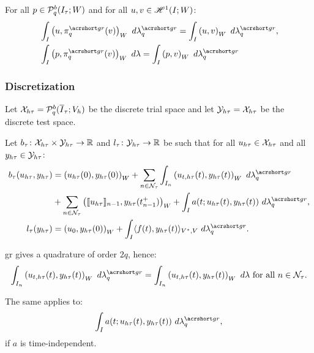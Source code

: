 \begin{proposition}
    For all $p \in \mathcal{P}_{q}^b(I_{\tau}; W)$ and for all $u, v \in \mathscr{H}^{1}(I; W)$:
    \begin{align}
        & \int_I \left( u, \InterpolantGR_q(v) \right)_W ~ d \lambdaGR_q = \int_I \left( u, v \right)_W ~ d \lambdaGR_q, \\
        & \int_I \left( p, \InterpolantGR_q(v) \right)_W ~ d \lambda = \int_I \left( p, v \right)_W ~ d \lambdaGR_q
    \end{align}
\end{proposition}

\subsubsection{Discretization}

\begin{definition}
    Let $\mathcal{X}_{h \tau} = \mathcal{P}_{q}^b(\overline{I}_{\tau}; V_h)$ be the discrete trial space and let $\mathcal{Y}_{h \tau} = \mathcal{X}_{h \tau}$ be the discrete test space.
\end{definition}

\begin{definition}
    Let $b_{\tau} \colon \mathcal{X}_{h \tau} \times \mathcal{Y}_{h \tau} \rightarrow \mathbb{R}$ and $l_{\tau} \colon \mathcal{Y}_{h \tau} \rightarrow \mathbb{R}$ be such that for all $u_{h \tau} \in \mathcal{X}_{h \tau}$ and all $y_{h \tau} \in \mathcal{Y}_{h \tau}$:
    \begin{align}
        b_{\tau}(u_{h \tau}, y_{h \tau}) & = \left( u_{h \tau}(0), y_{h \tau}(0) \right)_W + \sum_{n \in \TimeIndices} \int_{I_n} \left( u_{t, h \tau}(t), y_{h \tau}(t) \right)_W ~ d \lambdaGR_q \\
        & + \sum_{n \in \TimeIndices} \left( \llbracket u_{h \tau} \rrbracket_{n - 1}, y_{h \tau}(t_{n - 1}^+) \right)_W + \int_I a(t; u_{h \tau}(t), y_{h \tau}(t)) ~ d \lambdaGR_q, \notag \\
        l_{\tau}(y_{h \tau}) & = \left( u_0, y_{h \tau}(0) \right)_W + \int_I \langle f(t), y_{h \tau}(t) \rangle_{V^*, V} ~ d \lambdaGR_q.
    \end{align}
\end{definition}

\begin{remark}
    \acrshort{gr} gives a quadrature of order $2q$, hence:
    \begin{gather}
        \int_{I_n} \left( u_{t, h \tau}(t), y_{h \tau}(t) \right)_W ~ d \lambdaGR_q = \int_{I_n} \left( u_{t, h \tau}(t), y_{h \tau}(t) \right)_W ~ d \lambda \text{ for all } n \in \TimeIndices.
    \end{gather}
    
    The same applies to:
    \begin{gather}
        \int_I a(t; u_{h \tau}(t), y_{h \tau}(t)) ~ d \lambdaGR_q,
    \end{gather}
    if $a$ is time-independent.
\end{remark}

